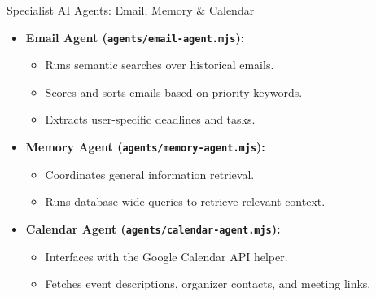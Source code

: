\documentclass[10pt]{beamer}
\begin{document}
\begin{frame}{Specialist AI Agents: Email, Memory \& Calendar}
  \begin{itemize}
    \item \textbf{Email Agent (\texttt{agents/email-agent.mjs}):}
      \begin{itemize}
        \item Runs semantic searches over historical emails.
        \item Scores and sorts emails based on priority keywords.
        \item Extracts user-specific deadlines and tasks.
      \end{itemize}
    \vspace{0.3cm}
    \item \textbf{Memory Agent (\texttt{agents/memory-agent.mjs}):}
      \begin{itemize}
        \item Coordinates general information retrieval.
        \item Runs database-wide queries to retrieve relevant context.
      \end{itemize}
    \vspace{0.3cm}
    \item \textbf{Calendar Agent (\texttt{agents/calendar-agent.mjs}):}
      \begin{itemize}
        \item Interfaces with the Google Calendar API helper.
        \item Fetches event descriptions, organizer contacts, and meeting links.
      \end{itemize}
  \end{itemize}
\end{frame}
\end{document}
